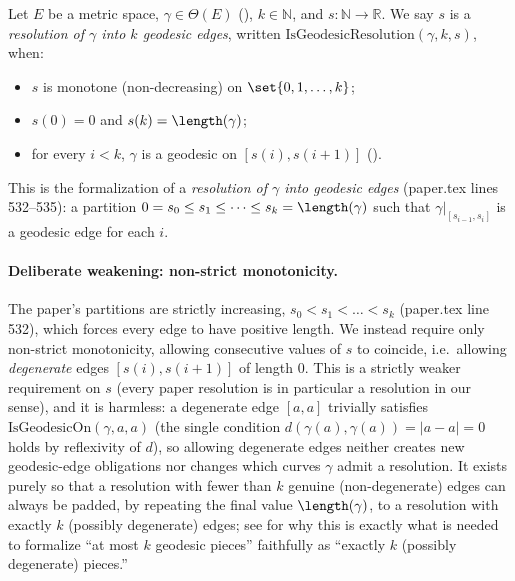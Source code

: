 \begin{definition}
  Let $E$ be a metric space, $\gamma \in \Theta(E)$ (), $k \in \mathbb{N}$, and
  $s \colon \mathbb{N} \to \mathbb{R}$. We say $s$ is a \emph{resolution of $\gamma$ into $k$
  geodesic edges}, written $\mathrm{IsGeodesicResolution}(\gamma,k,s)$, when:
  \begin{itemize}
    \item $s$ is monotone (non-decreasing) on $\set{0,1,\dots,k}$;
    \item $s(0) = 0$ and $s(k) = \length(\gamma)$;
    \item for every $i < k$, $\gamma$ is a geodesic on $[s(i), s(i+1)]$
      ().
  \end{itemize}
  This is the formalization of a \emph{resolution of $\gamma$ into geodesic edges}
  (paper.tex lines 532--535): a partition $0 = s_0 \le s_1 \le \dots \le s_k = \length(\gamma)$
  such that $\gamma|_{[s_{i-1},s_i]}$ is a geodesic edge for each $i$.

  \paragraph{Deliberate weakening: non-strict monotonicity.} The paper's partitions are strictly
  increasing, $s_0 < s_1 < \dots < s_k$ (paper.tex line 532), which forces every edge to have
  positive length. We instead require only non-strict monotonicity, allowing consecutive values of
  $s$ to coincide, i.e.\ allowing \emph{degenerate} edges $[s(i),s(i+1)]$ of length $0$. This is a
  strictly weaker requirement on $s$ (every paper resolution is in particular a resolution in our
  sense), and it is harmless: a degenerate edge $[a,a]$ trivially satisfies
  $\mathrm{IsGeodesicOn}(\gamma,a,a)$ (the single condition $d(\gamma(a),\gamma(a)) = |a-a| = 0$
  holds by reflexivity of $d$), so allowing degenerate edges neither creates new geodesic-edge
  obligations nor changes which curves $\gamma$ admit a resolution. It exists purely so that a
  resolution with fewer than $k$ genuine (non-degenerate) edges can always be padded, by repeating
  the final value $\length(\gamma)$, to a resolution with exactly $k$ (possibly degenerate) edges;
  see  for why this is exactly what is needed to formalize ``at
  most $k$ geodesic pieces'' faithfully as ``exactly $k$ (possibly degenerate) pieces.''
\end{definition}
